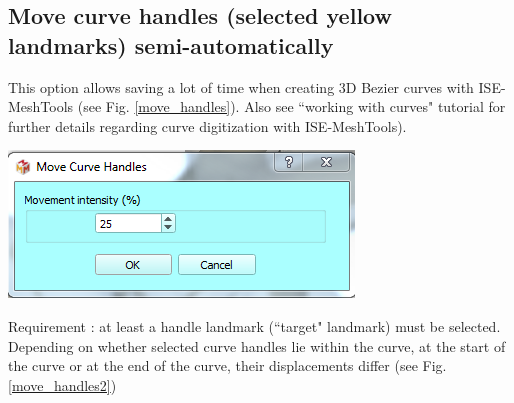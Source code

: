 \subsection{Move curve handles (selected yellow
landmarks) semi-automatically}
\noindent
\begin{minipage}{0.5\textwidth}
This option allows saving a lot of time when creating
3D Bezier curves with ISE-MeshTools (see Fig. \ref{move_handles}). Also see ``working
with curves" tutorial for further details regarding curve digitization with ISE-MeshTools).
\end{minipage}    
\begin{minipage}{0.5\textwidth}\centering
  \includegraphics[scale=0.5]{images/Edit_selected_landmarks/Move.png}
 \end{minipage} 
\noindent



Requirement : at least a handle landmark (``target" landmark) must be selected.
Depending on whether selected curve handles lie within the curve, at the start of the curve or at the
end of the curve, their displacements differ (see Fig. \ref{move_handles2})





